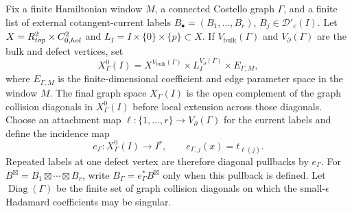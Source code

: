 \begin{defn}
\label{def:app-wavefront-admissible-defect-labels}
  Fix a finite Hamiltonian window \(M\), a connected Costello graph
  \(\Gamma\), and a finite list of external cotangent-current labels
  \(B_\bullet=(B_1,\ldots,B_r)\), \(B_j\in\mathcal D'_c(I)\).  Let
  \(X=R^2_{top}\times C^2_{0,hol}\) and
  \(L_I=I\times\{0\}\times\{p\}\subset X\).  If
  \(V_{\mathrm{bulk}}(\Gamma)\) and \(V_{\partial}(\Gamma)\) are the bulk
  and defect vertices, set
  \[
    X^0_\Gamma(I)=
    X^{V_{\mathrm{bulk}}(\Gamma)}
    \times L_I^{V_{\partial}(\Gamma)}
    \times E_{\Gamma,M},
  \]
  where \(E_{\Gamma,M}\) is the finite-dimensional coefficient and edge
  parameter space in the window \(M\).  The final graph space
  \(X_\Gamma(I)\) is the open complement of the graph collision
  diagonals in \(X^0_\Gamma(I)\) before local extension across those
  diagonals.  Choose an attachment map
  \(\ell:\{1,\ldots,r\}\to V_{\partial}(\Gamma)\) for the current labels
  and define the incidence map
  \[
    e_\Gamma:X^0_\Gamma(I)\longrightarrow I^r,\qquad
    e_{\Gamma,j}(x)=t_{\ell(j)} .
  \]
  Repeated labels at one defect vertex are therefore diagonal pullbacks
  by \(e_\Gamma\).  For
  \(B^\boxtimes=B_1\boxtimes\cdots\boxtimes B_r\), write
  \(B_\Gamma=e_\Gamma^*B^\boxtimes\) only when this pullback is defined.
  Let
  \(\operatorname{Diag}(\Gamma)\) be the finite set of graph collision
  diagonals on which the small-\(\epsilon\) Hadamard coefficients may be
  singular.


\end{defn}
